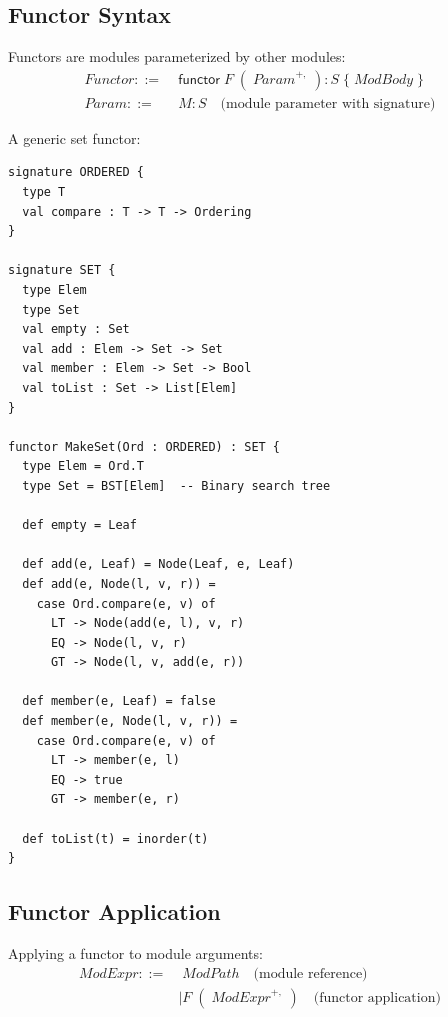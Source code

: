 \subsection{Functor Syntax}
\label{subsec:functor-syntax}

\begin{definition}
\label{def:functor-decl}
Functors are modules parameterized by other modules:
\begin{align}
\mathit{Functor} ::=&\; \mathsf{functor}\; F\; (\; \mathit{Param}^{+,}\; ) : S\; \{\; \mathit{ModBody}\; \} \\
\mathit{Param} ::=&\; M : S \quad \text{(module parameter with signature)}
\end{align}
\end{definition}

\begin{example}
\label{ex:functor-def}
A generic set functor:
\begin{verbatim}
signature ORDERED {
  type T
  val compare : T -> T -> Ordering
}

signature SET {
  type Elem
  type Set
  val empty : Set
  val add : Elem -> Set -> Set
  val member : Elem -> Set -> Bool
  val toList : Set -> List[Elem]
}

functor MakeSet(Ord : ORDERED) : SET {
  type Elem = Ord.T
  type Set = BST[Elem]  -- Binary search tree

  def empty = Leaf

  def add(e, Leaf) = Node(Leaf, e, Leaf)
  def add(e, Node(l, v, r)) =
    case Ord.compare(e, v) of
      LT -> Node(add(e, l), v, r)
      EQ -> Node(l, v, r)
      GT -> Node(l, v, add(e, r))

  def member(e, Leaf) = false
  def member(e, Node(l, v, r)) =
    case Ord.compare(e, v) of
      LT -> member(e, l)
      EQ -> true
      GT -> member(e, r)

  def toList(t) = inorder(t)
}
\end{verbatim}
\end{example}

\subsection{Functor Application}
\label{subsec:functor-application}

\begin{definition}
\label{def:functor-app}
Applying a functor to module arguments:
\begin{align}
\mathit{ModExpr} ::=&\; \mathit{ModPath} \quad \text{(module reference)} \\
    &\mid F\; (\; \mathit{ModExpr}^{+,}\; ) \quad \text{(functor application)}
\end{align}
\end{definition}

